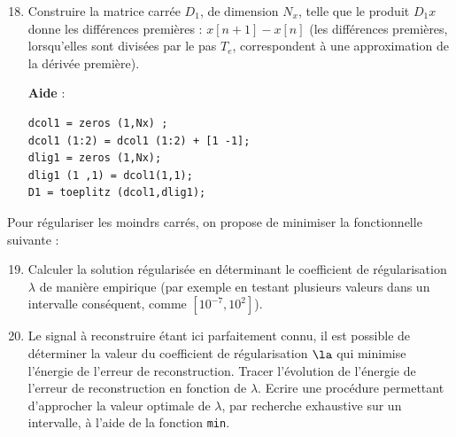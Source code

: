 \documentclass{article}
\begin{document}
\begin{enumerate}
		\setcounter{enumi}{17}
		\item Construire la matrice carrée $D_1$, de dimension $N_x$, telle que le produit $D_1x$ donne les différences premières : $x[n+1]-x[n]$ (les différences premières, lorsqu'elles sont divisées par le pas $T_e$, correspondent à une approximation de la dérivée première).

\textbf{Aide} :
\begin{lstlisting}
dcol1 = zeros (1,Nx) ;
dcol1 (1:2) = dcol1 (1:2) + [1 -1];
dlig1 = zeros (1,Nx);
dlig1 (1 ,1) = dcol1(1,1);
D1 = toeplitz (dcol1,dlig1);
\end{lstlisting}
\end{enumerate}


\noindent Pour régulariser les moindrs carrés, on propose de minimiser la fonctionnelle suivante : 
	\begin{enumerate}
		\setcounter{enumi}{18}
		\item Calculer la solution régularisée en déterminant le coefficient de régularisation $\lambda$ de manière empirique  (par exemple en testant plusieurs valeurs dans un intervalle conséquent, comme $[10^{-7},10^2]$).
		
		\item Le signal à reconstruire étant ici parfaitement connu, il est possible de déterminer la valeur du coefficient de régularisation $\la$ qui minimise l'énergie de l'erreur de reconstruction. Tracer l'évolution de l'énergie de l'erreur de reconstruction en fonction de
$\lambda$. Ecrire une procédure permettant d'approcher la valeur optimale de $\lambda$, par recherche exhaustive sur un intervalle, à l'aide de la fonction \texttt{min}.
	\end{enumerate}
\end{document}
